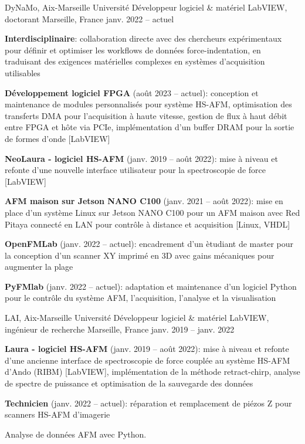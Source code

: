 
\begin{cventries}

  \cventry
    {DyNaMo, Aix-Marseille Universit\'e}
    {D\'eveloppeur logiciel \& mat\'eriel LabVIEW, doctorant}
    {Marseille, France}
    {janv. 2022 -- actuel}
    {
      \begin{cvitems}
        \item {\textbf{Interdisciplinaire}: collaboration directe avec des chercheurs exp\'erimentaux pour d\'efinir et optimiser les workflows de donn\'ees force-indentation, en traduisant des exigences mat\'erielles complexes en syst\`emes d'acquisition utilisables}
        \item{\textbf{D\'eveloppement logiciel FPGA} (ao\^ut 2023 -- actuel): conception et maintenance de modules personnalis\'es pour syst\`eme HS-AFM, optimisation des transferts DMA pour l'acquisition \`a haute vitesse, gestion de flux \`a haut d\'ebit entre FPGA et h\^ote via PCIe, impl\'ementation d'un buffer DRAM pour la sortie de formes d'onde [LabVIEW]}
        \item{\textbf{NeoLaura - logiciel HS-AFM} (janv. 2019 -- ao\^ut 2022): mise \`a niveau et refonte d'une nouvelle interface utilisateur pour la spectroscopie de force [LabVIEW]}
        \item {\textbf{AFM maison sur Jetson NANO C100} (janv. 2021 -- ao\^ut 2022): mise en place d'un syst\`eme Linux sur Jetson NANO C100 pour un AFM maison avec Red Pitaya connect\'e en LAN pour contr\^ole \`a distance et acquisition [Linux, VHDL]}
        \item {\textbf{OpenFMLab} (janv. 2022 -- actuel): encadrement d'un \`etudiant de master pour la conception d'un scanner XY imprim\'e en 3D avec gains m\'ecaniques pour augmenter la plage}
        \item {\textbf{PyFMlab} (janv. 2022 -- actuel): adaptation et maintenance d'un logiciel Python pour le contr\^ole du syst\`eme AFM, l'acquisition, l'analyse et la visualisation}
      \end{cvitems}
      \vspace{1em}
    }

  \cventry
    {LAI, Aix-Marseille Universit\'e}
    {D\'eveloppeur logiciel \& mat\'eriel LabVIEW, ing\'enieur de recherche}
    {Marseille, France}
    {janv. 2019 -- janv. 2022}
    {
      \begin{cvitems}
        \item{\textbf{Laura - logiciel HS-AFM} (janv. 2019 -- ao\^ut 2022): mise \`a niveau et refonte d'une ancienne interface de spectroscopie de force coupl\'ee au syst\`eme HS-AFM d'Ando (RIBM) [LabVIEW], impl\'ementation de la m\'ethode retract-chirp, analyse de spectre de puissance et optimisation de la sauvegarde des donn\'ees}
        \item {\textbf{Technicien} (janv. 2022 -- actuel): r\'eparation et remplacement de pi\'ezos Z pour scanners HS-AFM d'imagerie}
        \item Analyse de donn\'ees AFM avec Python.
      \end{cvitems}
      \vspace{1em}
    }


\end{cventries}
